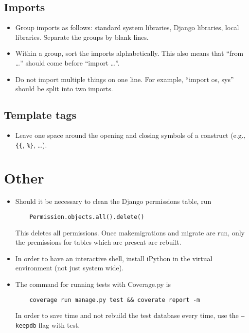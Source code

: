 \documentclass{article}
\begin{document}
\subsection{Imports}

\begin{itemize}
\item Group imports as follows: standard system libraries, Django libraries, local libraries. Separate the groups by blank lines.
\item Within a group, sort the imports alphabetically. This also means that ``from \ldots'' should come before ``import \ldots''.
\item Do not import multiple things on one line. For example, ``import os, sys'' should be split into two imports.
\end{itemize}

\subsection{Template tags}

\begin{itemize}
\item Leave one space around the opening and closing symbols of a construct (e.g., \verb+{{+, \verb+%}+, \ldots).
\end{itemize}

\section{Other}

\begin{itemize}
\item Should it be necessary to clean the Django permissions table, run
  \begin{lstlisting}
    Permission.objects.all().delete()
  \end{lstlisting}
  This deletes all permissions. Once makemigrations and migrate are run, only the premissions for tables which are present are rebuilt.
\item In order to have an interactive shell, install iPython in the virtual environment (not just system wide).
\item The command for running tests with Coverage.py is
  \begin{lstlisting}
    coverage run manage.py test && coverate report -m
  \end{lstlisting}
  In order to save time and not rebuild the test database every time, use the \texttt{--keepdb} flag with test.
\end{itemize}
\end{document}
